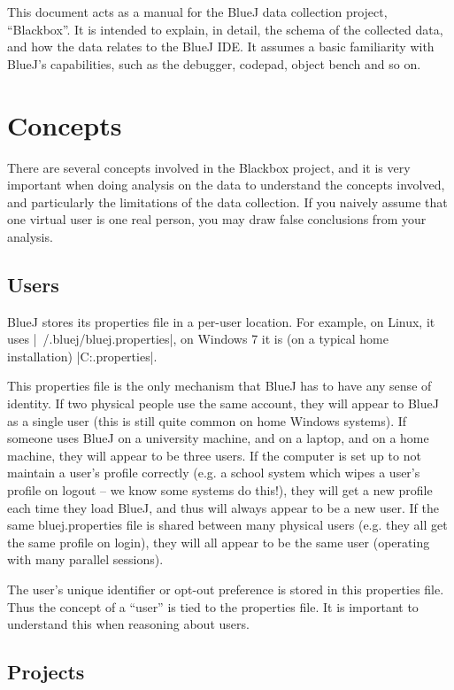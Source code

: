 \documentclass{book}
\begin{document}
This document acts as a manual for the BlueJ data collection project,
``Blackbox''.  It is intended to explain, in detail, the schema of the
collected data, and how the data relates to the BlueJ IDE.  It assumes a basic
familiarity with BlueJ's capabilities, such as the debugger, codepad, object
bench and so on.

\chapter{Concepts}

There are several concepts involved in the Blackbox project, and it is
very important when doing analysis on the data to understand the concepts
involved, and particularly the limitations of the data collection.  If you
naively assume that one virtual user is one real person, you may draw false
conclusions from your analysis.

\section{Users}

BlueJ stores its properties file in a per-user location.  For example, on
Linux, it uses |~/.bluej/bluej.properties|, on Windows 7 it is (on a typical
home installation) |C:\Users\Joe\bluej\bluej.properties|.

This properties file is the only mechanism that BlueJ has to have any sense of
identity.  If two physical people use the same account, they will appear to
BlueJ as a single user (this is still quite common on home Windows systems).
If someone uses BlueJ on a university machine, and on a laptop, and on a home
machine, they will appear to be three users.
If the computer is set up to not maintain a user's profile correctly (e.g. a
school system which wipes a user's profile on logout -- we know some systems
do this!), they will get a new profile each time they load BlueJ, and thus
will always appear to be a new user.  If the same bluej.properties file is
shared between many physical users (e.g. they all get the same profile on
login), they will all appear to be the same user (operating with many parallel sessions).

The user's unique identifier or opt-out preference is stored in this
properties file.  Thus the concept of a ``user'' is tied to the properties
file.  It is important to understand this when reasoning about users.

\section{Projects}
\end{document}
